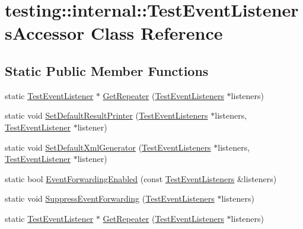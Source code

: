 \hypertarget{classtesting_1_1internal_1_1_test_event_listeners_accessor}{}\section{testing\+::internal\+::Test\+Event\+Listeners\+Accessor Class Reference}
\label{classtesting_1_1internal_1_1_test_event_listeners_accessor}
\subsection*{Static Public Member Functions}
\begin{DoxyCompactItemize}
\item 
static \mbox{\hyperlink{classtesting_1_1_test_event_listener}{Test\+Event\+Listener}} $\ast$ \mbox{\hyperlink{classtesting_1_1internal_1_1_test_event_listeners_accessor_a07c6f8644e509d0f23c0c16a60856387}{Get\+Repeater}} (\mbox{\hyperlink{classtesting_1_1_test_event_listeners}{Test\+Event\+Listeners}} $\ast$listeners)
\item 
static void \mbox{\hyperlink{classtesting_1_1internal_1_1_test_event_listeners_accessor_ac8886c7cea5a4ad39aed276d3f58da75}{Set\+Default\+Result\+Printer}} (\mbox{\hyperlink{classtesting_1_1_test_event_listeners}{Test\+Event\+Listeners}} $\ast$listeners, \mbox{\hyperlink{classtesting_1_1_test_event_listener}{Test\+Event\+Listener}} $\ast$listener)
\item 
static void \mbox{\hyperlink{classtesting_1_1internal_1_1_test_event_listeners_accessor_a8c04463b5ba5ee6d6da36e2171c7fff0}{Set\+Default\+Xml\+Generator}} (\mbox{\hyperlink{classtesting_1_1_test_event_listeners}{Test\+Event\+Listeners}} $\ast$listeners, \mbox{\hyperlink{classtesting_1_1_test_event_listener}{Test\+Event\+Listener}} $\ast$listener)
\item 
static bool \mbox{\hyperlink{classtesting_1_1internal_1_1_test_event_listeners_accessor_a4a7522557045cb55eb037dc61429d71c}{Event\+Forwarding\+Enabled}} (const \mbox{\hyperlink{classtesting_1_1_test_event_listeners}{Test\+Event\+Listeners}} \&listeners)
\item 
static void \mbox{\hyperlink{classtesting_1_1internal_1_1_test_event_listeners_accessor_abfc0a0f8163465f4f5d42436ec8c7cb3}{Suppress\+Event\+Forwarding}} (\mbox{\hyperlink{classtesting_1_1_test_event_listeners}{Test\+Event\+Listeners}} $\ast$listeners)
\item 
static \mbox{\hyperlink{classtesting_1_1_test_event_listener}{Test\+Event\+Listener}} $\ast$ \mbox{\hyperlink{classtesting_1_1internal_1_1_test_event_listeners_accessor_a07c6f8644e509d0f23c0c16a60856387}{Get\+Repeater}} (\mbox{\hyperlink{classtesting_1_1_test_event_listeners}{Test\+Event\+Listeners}} $\ast$listeners)

\end{DoxyCompactItemize}
